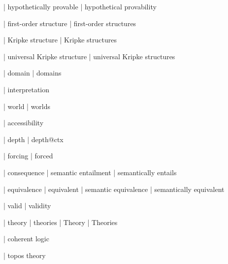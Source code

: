  | hypothetically provable
 | hypothetical provability

 | first-order structure
 | first-order structures

 | Kripke structure
 | Kripke structures

 | universal Kripke structure
 | universal Kripke structures

 | domain
 | domains

 | interpretation

 | world
 | worlds

 | accessibility

 | depth
 | depth@ctx

 | forcing
 | forced

 | consequence
 | semantic entailment
 | semantically entails

 | equivalence
 | equivalent
 | semantic equivalence
 | semantically equivalent

 | valid
 | validity

 | theory
 | theories
 | Theory
 | Theories

 | coherent logic

 | topos theory